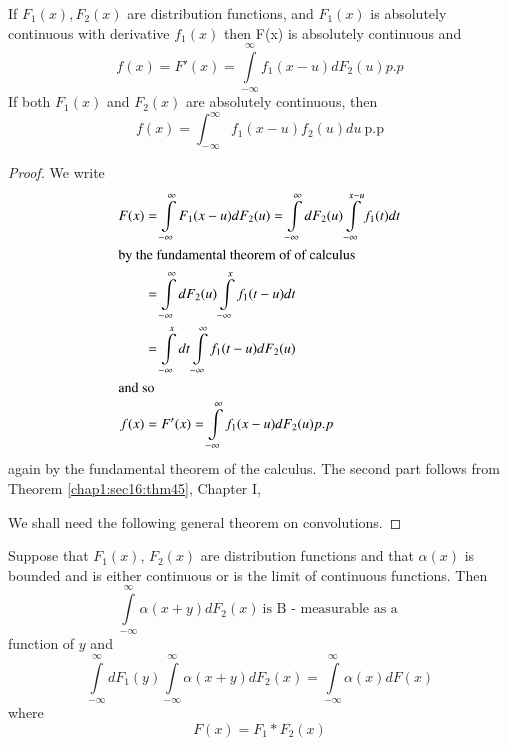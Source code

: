 \begin{theorem}\label{chap2:sec4:thm8} %
  If $F_1 (x), F_2 (x)$ are distribution functions, and $F_1 (x)$ is
  absolutely continuous with derivative $f_1(x)$ then F(x) is absolutely
  continuous and  
  $$ 
  f(x) = F' (x) = \int\limits_{-\infty}^{\infty} f_1 (x -u) d F_2 (u)
  p.p
  $$
  If both $F_1 (x)$ and $F_2(x)$ are absolutely continuous, then
  $$ 
  f(x) = \int_{- \infty}^{\infty} f_1 (x -u) f_2 (u) du ~\text{p.p}  
  $$
\end{theorem}

\begin{proof}
  We write
  \begin{align*}
    F(x) &= 
    \int\limits_{- \infty}^{\infty} F_1 (x- u) d F_2 (u) =
    \int\limits_{- \infty}^{\infty} d F_2 (u) 
    \int\limits_{- \infty}^{{x-u}} f_1 (t) dt\\
    \intertext{by the fundamental theorem of of calculus}
    &= \int\limits_{- \infty}^{\infty} d F_2 (u) \int\limits_{- \infty}^{x}
    f_1 (t - u) dt\\ 
    & = \int\limits_{- \infty}^{x} dt \int\limits_{- \infty}^{\infty} f_1
    (t - u) dF_2 (u)\\ 
    \intertext{and so} 
    f(x) &= F'(x) = \int\limits_{- \infty}^{\infty} f_1 (x - u) dF_2 (u) p.p 
  \end{align*}\pageoriginale
  again by the fundamental theorem of the calculus. The second part
  follows from Theorem \ref{chap1:sec16:thm45}, Chapter I, 
  
  We shall need the following general theorem on convolutions.
\end{proof}

\begin{theorem}\label{chap2:sec4:thm9} %
  Suppose that $F_1 (x)$, $F_2 (x)$ are distribution functions and that
  $\alpha (x)$ is bounded and is either continuous or is the limit of
  continuous functions. Then 
  $$ 
  \int\limits_{-\infty}^{\infty}\alpha (x + y) d F_2 (x) ~\text{is B
    - measurable as a }
  $$
  function of $y$ and   
  $$
  \int\limits_{- \infty}^{\infty} d F_1 (y) 
  \int\limits_{-\infty}^{\infty} \alpha (x + y) d F_2 (x) = 
  \int\limits_{-\infty}^{\infty} \alpha (x) d F(x)
  $$
  where
  $$ 
  F(x)= F_1 \ast F_2 (x)
  $$
\end{theorem}

